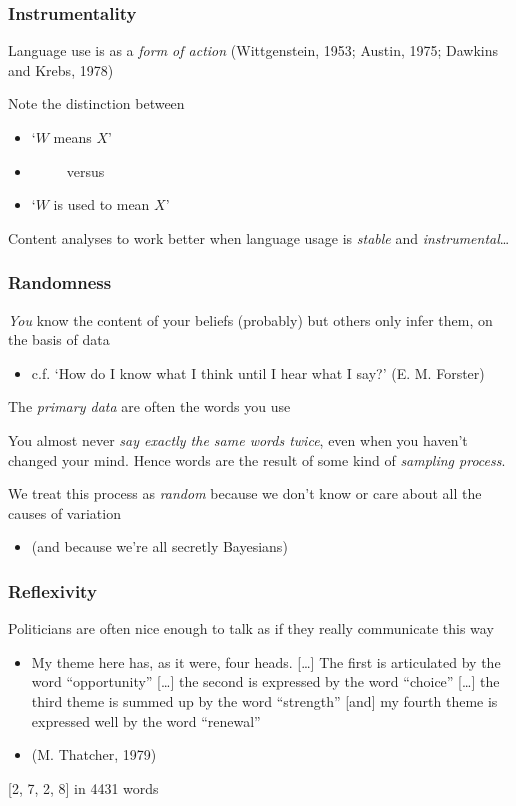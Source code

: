 \documentclass[11pt,compress,professionalfonts]{beamer}
\newcommand{\ita}{\begin{itemize}}
\newcommand{\itm}{\item[]}
\newcommand{\itz}{\end{itemize}}
\begin{document}
\begin{frame}[t]\frametitle{Instrumentality}

Language use is as a \textit{form of action} (Wittgenstein, 1953; Austin, 1975; Dawkins and Krebs, 1978)

Note the distinction between
\ita
\itm `$W$ {means} $X$'
\itm ~~~~~versus
\itm `$W$ {is used to mean} $X$'
\itz

Content analyses to work better when language usage is \textit{stable} and \textit{instrumental}\ldots



\end{frame}
\begin{frame}[t]\frametitle{Randomness}

\textit{You} know the content of your beliefs (probably)
but others only infer them, on the basis of data
\ita
\itm c.f. `How do I know what I think until I hear what I say?' (E. M. Forster)
\itz
The \textsl{primary data} are often the words you use

You almost never \textit{say exactly the same words twice}, even when you haven't changed your mind.  Hence words are the result of some kind of \textsl{sampling process}.

We treat this process as \textsl{random} because we don't know or care about all the causes of variation
\ita
\itm (and because we're all secretly Bayesians)
\itz

%
%
%
%

\end{frame}
\begin{frame}[t]\frametitle{Reflexivity}

Politicians are often nice enough to talk as if they really communicate this way

\ita
\itm My theme here has, as it were, four heads. [\ldots] The first is articulated by the word ``opportunity'' [\ldots] the second is expressed by the word ``choice'' [\ldots] the third theme is summed up by the word ``strength'' [and] my fourth theme is expressed well by the word ``renewal''
\itm (M. Thatcher, 1979)
\itz

[2, 7, 2, 8] in 4431 words

\end{frame}
\end{document}
